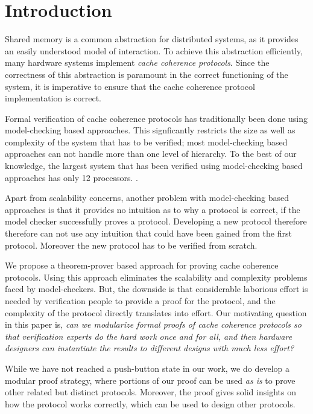 \section{Introduction}
\label{sec:Introduction}

Shared memory is a common abstraction for distributed systems, as it provides
an easily understood model of interaction. To achieve this abstraction
efficiently, many hardware systems implement \emph{cache coherence protocols}.
Since the correctness of this abstraction is paramount in the correct
functioning of the system, it is imperative to ensure that the cache coherence
protocol implementation is correct.

Formal verification of cache coherence protocols has traditionally been done
using model-checking based approaches. This signficantly restricts the size as
well as complexity of the system that has to be verified; most model-checking
based approaches can not handle more than one level of hierarchy. To the best
of our knowledge, the largest system that has been verified using
model-checking based approaches has only 12 processors. .

Apart from scalability concerns, another problem with model-checking based
approaches is that it provides no intuition as to why a protocol is correct, if
the model checker successfully proves a protocol. Developing a new protocol
therefore therefore can not use any intuition that could have been gained from
the first protocol. Moreover the new protocol has to be verified from scratch.

We propose a theorem-prover based approach for proving cache coherence
protocols. Using this approach eliminates the scalability and complexity
problems faced by model-checkers. But, the downside is that considerable
laborious effort is needed by verification people to provide a proof for the
protocol, and the complexity of the protocol directly translates into effort.
Our motivating question in this paper is,
\emph{can we modularize formal proofs of cache coherence protocols so that
verification experts do the hard work once and for all, and then hardware
designers can instantiate the results to different designs with much less
effort?}

While we have not reached a push-button state in our work, we do develop a
modular proof strategy, where portions of our proof can be used \emph{as is} to
prove other related but distinct protocols. Moreover, the proof gives solid
insights on how the protocol works correctly, which can be used to design other
protocols.

